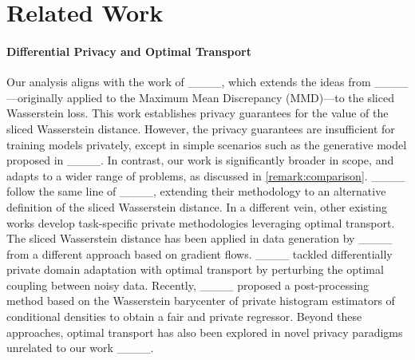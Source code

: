\section{Related Work}
\paragraph{Differential Privacy and Optimal Transport}
Our analysis aligns with the work of ____, which extends the ideas from ____—originally applied to the Maximum Mean Discrepancy (MMD)—to the sliced Wasserstein loss. This work establishes privacy guarantees for the value of the sliced Wasserstein distance. However, the privacy guarantees are insufficient for training models privately, except in simple scenarios such as the generative model proposed in ____. In contrast, our work is significantly broader in scope, and adapts to a wider range of problems, as discussed in \cref{remark:comparison}. ____ follow the same line of ____, extending their methodology to an alternative definition of the sliced Wasserstein distance.  In a different vein, other existing works develop task-specific private methodologies leveraging optimal transport. The sliced Wasserstein distance has been applied in data generation by ____ from a different approach based on gradient flows. ____ tackled differentially private domain adaptation with optimal transport by perturbing the optimal coupling between noisy data. Recently, ____ proposed a post-processing method based on the Wasserstein barycenter of private histogram estimators of conditional densities to obtain a fair and private regressor. Beyond these approaches, optimal transport has also been explored in novel privacy paradigms unrelated to our work ____.
